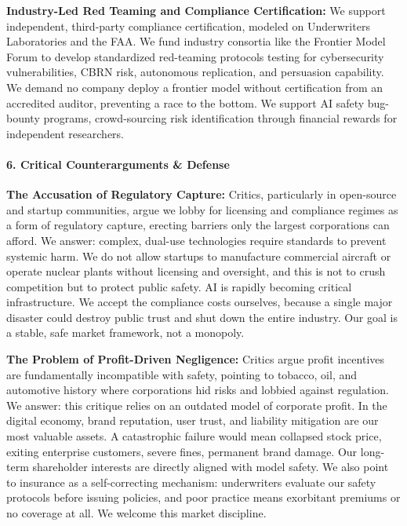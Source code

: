 \textbf{Industry-Led Red Teaming and Compliance Certification:} We
support independent, third-party compliance certification, modeled on
Underwriters Laboratories and the FAA. We fund industry consortia like
the Frontier Model Forum to develop standardized red-teaming protocols
testing for cybersecurity vulnerabilities, CBRN risk, autonomous
replication, and persuasion capability. We demand no company deploy a
frontier model without certification from an accredited auditor,
preventing a race to the bottom. We support AI safety bug-bounty
programs, crowd-sourcing risk identification through financial rewards
for independent researchers.

\paragraph{6. Critical Counterarguments \&
Defense}\label{critical-counterarguments-defense-15}

\textbf{The Accusation of Regulatory Capture:} Critics, particularly in
open-source and startup communities, argue we lobby for licensing and
compliance regimes as a form of regulatory capture, erecting barriers
only the largest corporations can afford. We answer: complex, dual-use
technologies require standards to prevent systemic harm. We do not allow
startups to manufacture commercial aircraft or operate nuclear plants
without licensing and oversight, and this is not to crush competition
but to protect public safety. AI is rapidly becoming critical
infrastructure. We accept the compliance costs ourselves, because a
single major disaster could destroy public trust and shut down the
entire industry. Our goal is a stable, safe market framework, not a
monopoly.

\textbf{The Problem of Profit-Driven Negligence:} Critics argue profit
incentives are fundamentally incompatible with safety, pointing to
tobacco, oil, and automotive history where corporations hid risks and
lobbied against regulation. We answer: this critique relies on an
outdated model of corporate profit. In the digital economy, brand
reputation, user trust, and liability mitigation are our most valuable
assets. A catastrophic failure would mean collapsed stock price, exiting
enterprise customers, severe fines, permanent brand damage. Our
long-term shareholder interests are directly aligned with model safety.
We also point to insurance as a self-correcting mechanism: underwriters
evaluate our safety protocols before issuing policies, and poor practice
means exorbitant premiums or no coverage at all. We welcome this market
discipline.

